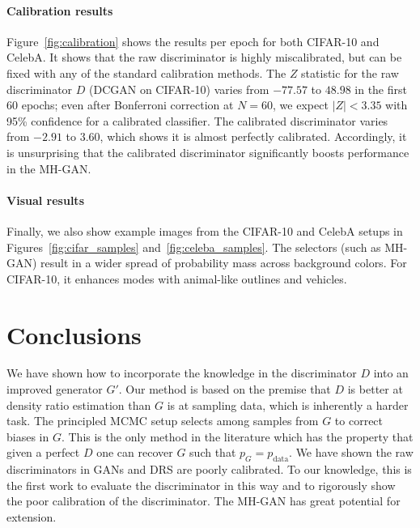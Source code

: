 \documentclass{article}
\newcommand{\PG}{{p_G}}
\newcommand{\PR}{{p_{\textrm{data}}}}
\begin{document}
\paragraph{Calibration results}
Figure~\ref{fig:calibration} shows the results per epoch for both CIFAR-10 and CelebA\@.
It shows that the raw discriminator is highly miscalibrated, but can be fixed with any of the standard calibration methods.
The $Z$ statistic for the raw discriminator $D$ (DCGAN on CIFAR-10) varies from $-77.57$ to $48.98$ in the first 60 epochs; even after Bonferroni correction at $N \!\!=\!\! 60$, we expect $|Z| < 3.35$ with 95\% confidence for a calibrated classifier.
The calibrated discriminator varies from $-2.91$ to $3.60$, which shows it is almost perfectly calibrated.
Accordingly, it is unsurprising that the calibrated discriminator significantly boosts performance in the MH-GAN\@.




\paragraph{Visual results}
Finally, we also show example images from the CIFAR-10 and CelebA setups in Figures~\ref{fig:cifar_samples} and~\ref{fig:celeba_samples}.
The selectors (such as MH-GAN) result in a wider spread of probability mass across background colors.
For CIFAR-10, it enhances modes with animal-like outlines and vehicles.

\section{Conclusions}
\label{sec:conclusions}

We have shown how to incorporate the knowledge in the discriminator $D$ into an improved generator $G'$.
Our method is based on the premise that $D$ is better at density ratio estimation than $G$ is at sampling data, which is inherently a harder task.
The principled MCMC setup selects among samples from $G$ to correct biases in $G$.
This is the only method in the literature which has the property that given a perfect $D$ one can recover $G$ such that $\PG = \PR$.
We have shown the raw discriminators in GANs and DRS are poorly calibrated.
To our knowledge, this is the first work to evaluate the discriminator in this way and to rigorously show the poor calibration of the discriminator.
The MH-GAN has great potential for extension.

\FloatBarrier


\end{document}
